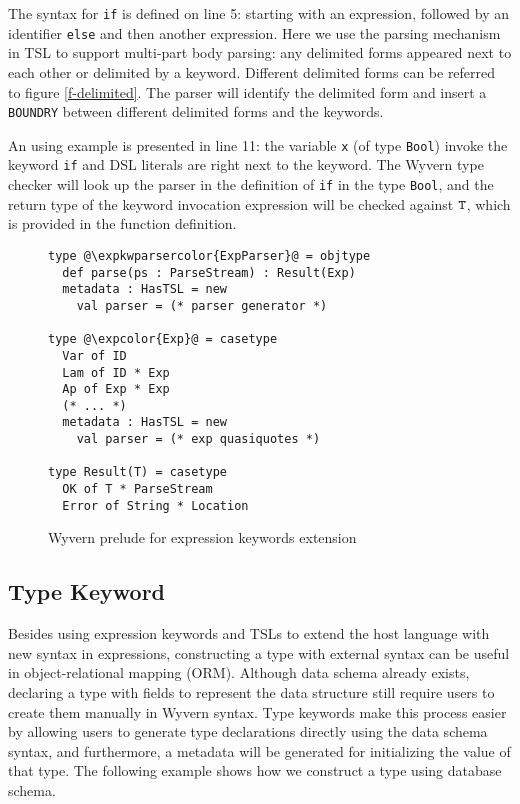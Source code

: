 \documentclass{sig-alternate}
\newcommand{\expkwparsercolor}[1]{\textcolor[HTML]{336699}{#1}}
\newcommand{\expcolor}[1]{\textcolor[HTML]{FF0033}{#1}}
\newcommand{\mycaption}[1]{\vspace{-4px}\caption{#1}\vspace{-2px}}
\begin{document}
The syntax for \verb|if| is defined on line 5: starting with an expression, followed by an identifier \verb|else| and then another expression. Here we use the parsing mechanism in TSL to support multi-part body parsing: any delimited forms appeared next to each other or delimited by a keyword. Different delimited forms can be referred to figure \ref{f-delimited}. The parser will identify the delimited form and insert a \verb|BOUNDRY| between different delimited forms and the keywords. 

An using example is presented in line 11: the variable \verb|x| (of type \verb|Bool|) invoke the keyword \verb|if| and DSL literals are right next to the keyword. The Wyvern type checker will look up the parser in the definition of \verb|if| in the type \verb|Bool|, and the return type of the keyword invocation expression will be checked against $\verb|T|$, which is provided in the function definition.  

\begin{figure}[ht!]
\begin{lstlisting}[style=wyvern]
type @\expkwparsercolor{ExpParser}@ = objtype
  def parse(ps : ParseStream) : Result(Exp)
  metadata : HasTSL = new 
    val parser = (* parser generator *)

type @\expcolor{Exp}@ = casetype
  Var of ID
  Lam of ID * Exp
  Ap of Exp * Exp
  (* ... *)
  metadata : HasTSL = new
    val parser = (* exp quasiquotes *)

type Result(T) = casetype
  OK of T * ParseStream
  Error of String * Location
\end{lstlisting}
\mycaption{Wyvern prelude for expression keywords extension}
\label{exp-prelude}
\end{figure}

\subsection{Type Keyword}
Besides using expression keywords and TSLs to extend the host language with new syntax in expressions, constructing a type with external syntax can be useful in object-relational mapping (ORM). Although data schema already exists, declaring a type with fields to represent the data structure still require users to create them manually in Wyvern syntax. Type keywords make this process easier by allowing users to generate type declarations directly using the data schema syntax, and furthermore, a metadata will be generated for initializing the value of that type. The following example shows how we construct a type using database schema.
\end{document}
